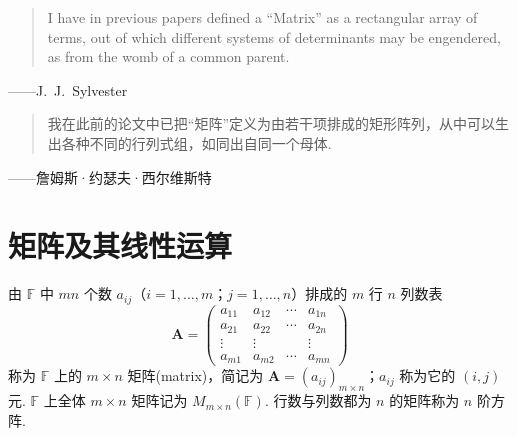 \documentclass[lang=cn,10.5pt,scheme=chinese,toc=twocol,section,chinesefont=nofont,
twoside,citestyle=gb7714-2015,bibstyle=gb7714-2015]{elegantbook}
\DeclareRobustCommand{\textbf}[1]{{\lnsemiboldlatin\lnsemiboldcjk #1}}
\newcommand{\vv}[1]{\boldsymbol{#1}}
\numberwithin{equation}{section}   %
\begin{document}
\newpage

\begin{tcolorbox}[epigraph, epigraph image*={0.25\linewidth}{image/sylvester.jpg}{詹姆斯·约瑟夫·西尔维斯特}{fig:sylvester}]
  \begin{quote}
    I have in previous papers defined a “Matrix” as a rectangular array of terms, out of which different systems of determinants may be engendered, as from the womb of a common parent.
  \end{quote}
  \begin{flushright}
    ——J.~J.~Sylvester
  \end{flushright}
  \begin{quote}
    我在此前的论文中已把“矩阵”定义为由若干项排成的矩形阵列，从中可以生出各种不同的行列式组，如同出自同一个母体.
  \end{quote}
  \begin{flushright}
    ——詹姆斯·约瑟夫·西尔维斯特\footnotemark
  \end{flushright}
\end{tcolorbox}

\section{矩阵及其线性运算}

\begin{definition}
  由 $\mathbb{F}$ 中 $mn$ 个数 $a_{ij}$（$i=1,\ldots,m$；$j=1,\ldots,n$）排成的 $m$ 行 $n$ 列数表
  \[\vv{A}=
    \begin{pmatrix}
      a_{11} & a_{12} & \cdots & a_{1n} \\
      a_{21} & a_{22} & \cdots & a_{2n} \\
      \vdots & \vdots &        & \vdots \\
      a_{m1} & a_{m2} & \cdots & a_{mn}
    \end{pmatrix}
  \]
  称为 $\mathbb{F}$ 上的 $m\times n$ \textbf{矩阵}(matrix)，简记为 $\vv{A}=(a_{ij})_{m\times n}$；$a_{ij}$ 称为它的 $(i,j)$ 元. $\mathbb{F}$ 上全体 $m\times n$ 矩阵记为 $M_{m\times n}(\mathbb{F})$. 行数与列数都为 $n$ 的矩阵称为 $n$ 阶\textbf{方阵}.
\end{definition}
\end{document}
